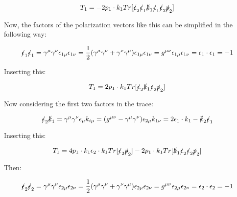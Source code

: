 \documentclass[a4]{article}
\begin{document}
    \begin{equation}
        T_1 = - 2 p_1 \cdot k_1 Tr[\slashed{\epsilon}_2 \slashed{\epsilon}_1 \slashed{k}_1 \slashed{\epsilon}_1 \slashed{\epsilon}_2 \slashed{p}_2]
    \end{equation}

    Now, the factors of the polarization vectors like this can be simplified in the following way:

    \begin{equation}
        \slashed{\epsilon}_1 \slashed{\epsilon}_1 = \gamma^\mu \gamma^\nu \epsilon_{1 \mu} \epsilon_{1 \nu} = \frac{1}{2} (\gamma^\mu \gamma^\nu + \gamma^\nu \gamma^\mu) \epsilon_{1 \mu} \epsilon_{1 \nu} = g^{\mu \nu} \epsilon_{1 \mu} \epsilon_{1 \nu} = \epsilon_1 \cdot \epsilon_1 = - 1
    \end{equation}

    Inserting this:

    \begin{equation}
        T_1 = 2 p_1 \cdot k_1 Tr[\slashed{\epsilon}_2 \slashed{k}_1 \slashed{\epsilon}_2 \slashed{p}_2]
    \end{equation}

    Now considering the first two factors in the trace:

    \begin{equation}
        \slashed{\epsilon}_2 \slashed{k}_1 = \gamma^\mu \gamma^\nu \epsilon_\mu k_{i \mu} = (g^{\mu \nu} - \gamma^\mu \gamma^\nu) \epsilon_{2 \mu} k_{1 \nu} = 2 \epsilon_1 \cdot k_1 - \slashed{k}_2 \slashed{\epsilon}_1
    \end{equation}

    Inserting this:

    \begin{equation}
        T_1 = 4 p_1 \cdot k_1 \epsilon_2 \cdot k_1 Tr[\slashed{\epsilon}_2 \slashed{p}_2] - 2 p_1 \cdot k_1 Tr[\slashed{k}_1 \slashed{\epsilon}_2 \slashed{\epsilon}_2 \slashed{p}_2]
    \end{equation}

    Then:

    \begin{equation}
        \slashed{\epsilon}_2 \slashed{\epsilon}_2 = \gamma^\mu \gamma^\nu \epsilon_{2 \mu} \epsilon_{2 \nu} = \frac{1}{2} (\gamma^\mu \gamma^\nu + \gamma^\nu \gamma^\mu) \epsilon_{2 \mu} \epsilon_{2 \nu} = g^{\mu \nu} \epsilon_{2 \mu} \epsilon_{2 \nu} = \epsilon_2 \cdot \epsilon_2 = - 1
    \end{equation}
\end{document}
